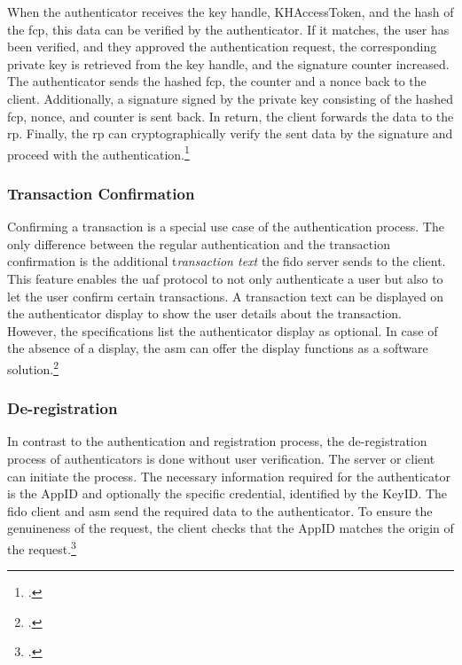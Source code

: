 When the authenticator receives the key handle, KHAccessToken, and the hash of the \gls{fcp}, this data can be verified by the authenticator. If it matches, the user has been verified, and they approved the authentication request, the corresponding private key is retrieved from the key handle, and the signature counter increased. The authenticator sends the hashed \gls{fcp}, the counter and a \gls{nonce} back to the client. Additionally, a signature signed by the private key consisting of the hashed \gls{fcp}, nonce, and counter is sent back. In return, the client forwards the data to the \gls{rp}. Finally, the \gls{rp} can cryptographically verify the sent data by the signature and proceed with the authentication.\footcites[See][20--21]{uaf-auth-commands}[See][15]{analysis_fido_master_thesis}

\subsubsection{Transaction Confirmation}

Confirming a transaction is a special use case of the authentication process. The only difference between the regular authentication and the transaction confirmation is the additional t\textit{ransaction text} the \gls{fido} server sends to the client. This feature enables the \gls{uaf} protocol to not only authenticate a user but also to let the user confirm certain transactions. A transaction text can be displayed on the authenticator display to show the user details about the transaction. However, the specifications list the authenticator display as optional. In case of the absence of a display, the \gls{asm} can offer the display functions as a software solution.\footcites[See][4]{uaf-overview}[See][251]{Schwartz2018}

\subsubsection{De-registration}

In contrast to the authentication and registration process, the de-registration process of authenticators is done without user verification. The server or client can initiate the process. The necessary information required for the authenticator is the AppID and optionally the specific credential, identified by the KeyID. The \gls{fido} client and \gls{asm} send the required data to the authenticator. To ensure the genuineness of the request, the client checks that the AppID matches the origin of the request.\footcites[See][31]{uaf-protocol}[See][7]{uaf-overview}
